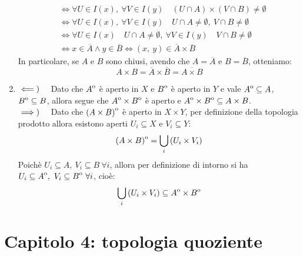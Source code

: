 \begin{demonstration}
\begin{enumerate}[label=\Roman*]
\begin{align*}
			&\iff \forall U\in I\left(x\right),\ \forall V\in I\left(y\right)\quad \left(U\cap A\right)\times\left(V\cap B\right)\neq \emptyset\\
			&\iff \forall U\in I\left(x\right),\ \forall V\in I\left(y\right)\quad U\cap A\neq \emptyset ,\ V\cap B\neq \emptyset\\
			&\iff \forall U\in I\left(x\right)\quad U\cap A\neq \emptyset ,\ \forall V\in I\left(y\right)\quad V\cap B\neq \emptyset\\
			&\iff x\in\overline{A}\wedge y\in \overline{B}\iff\left(x,\ y\right)\in\overline{A}\times \overline{B}
		\end{align*}
		In particolare, se $A$ e $B$ sono chiusi, avendo che $A=\overline{A}$ e $B=\overline{B}$, otteniamo:
		\begin{equation*}
			A\times B=\overline{A}\times \overline{B}=\overline{A\times B}
		\end{equation*}
	\item$\impliedby)\quad$ Dato che ${\kern0ptA}^{\mathrm{o}}$ è aperto in $X$ e ${\kern0ptB}^{\mathrm{o}}$ è aperto in $Y$ e vale ${\kern0ptA}^{\mathrm{o}}\subseteq A$, ${\kern0ptB}^{\mathrm{o}}\subseteq{B}$, allora segue che ${\kern0ptA}^{\mathrm{o}}\times{\kern0ptB}^{\mathrm{o}}$ è aperto e ${\kern0ptA}^{\mathrm{o}}\times{\kern0ptB}^{\mathrm{o}}\subseteq A\times B$.\\
	$\implies)\quad$ Dato che ${\kern0pt\left(A\times B\right)}^{\mathrm{o}}$ è aperto in $X\times Y$, per definizione della topologia prodotto allora esistono aperti $U_i\subseteq X$ e $V_i\subseteq Y$:
	\begin{equation*}
		{\kern0pt\left(A\times B\right)}^{\mathrm{o}}=\bigcup_i\left(U_i\times V_i\right)
	\end{equation*}
	Poichè $U_i\subseteq A,\ V_i\subseteq B\ \forall i$, allora per definizione di intorno si ha $U_i\subseteq\interior{A},\ V_i\subseteq\interior{B}\ \forall i$, cioè:
	\begin{equation*}
		\bigcup_i\left(U_i\times V_i\right)\subseteq {\kern0ptA}^{\mathrm{o}}\times {\kern0ptB}^{\mathrm{o}}
	\end{equation*}
	\end{enumerate}
	\vspace{-6mm}
\end{demonstration}
\section{Capitolo 4: topologia quoziente}
